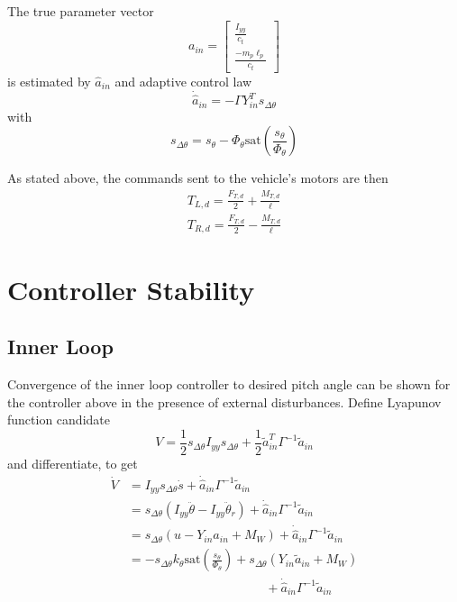 \documentclass[letterpaper, 10 pt, conference]{ieeeconf}\usepackage[margin=1in]{geometry}
\begin{document}
The true parameter vector
\begin{equation}
	a_{in} = \begin{bmatrix}
			\frac{I_{yy}}{c_t} \\
			\frac{-m_p \ell_p}{c_t}
		\end{bmatrix}
\end{equation}
is estimated by $\hat{a}_{in}$ and adaptive control law
\begin{equation}
	\dot{\hat{a}}_{in} = - \Gamma Y^T_{in} s_{\Delta \theta}
\end{equation}
with 
\begin{equation}
	s_{\Delta\theta} = s_{\theta} - \Phi_{\theta} \text{sat}(\frac{s_{\theta}}{\Phi_{\theta}})
\end{equation}

As stated above, the commands sent to the vehicle's motors are then
\begin{align}
	T_{L,d} = \frac{F_{T,d}}{2} + \frac{M_{T,d}}{\ell}\\
	T_{R,d} = \frac{F_{T,d}}{2} - \frac{M_{T,d}}{\ell}
\end{align}

\section{Controller Stability}
\subsection{Inner Loop}
Convergence of the inner loop controller to desired pitch angle can be shown for the controller above in the presence of external disturbances. Define Lyapunov function candidate
\begin{equation}
	V = \frac{1}{2}s_{\Delta \theta} I_{yy} s_{\Delta \theta} + \frac{1}{2}\tilde{a}_{in}^T \Gamma^{-1} \tilde{a}_{in}
\end{equation} 
and differentiate, to get
\begin{align*}
	\dot V &= I_{yy} s_{\Delta \theta} \dot s + \dot{\hat{a}}_{in} \Gamma^{-1} \tilde{a}_{in} \\
	~ &= s_{\Delta \theta} (I_{yy}\ddot{\theta} - I_{yy}\ddot{\theta}_r) + \dot{\hat{a}}_{in} \Gamma^{-1} \tilde{a}_{in} \\
	~ &= s_{\Delta \theta} (u - Y_{in}a_{in} + M_W) + \dot{\hat{a}}_{in} \Gamma^{-1} \tilde{a}_{in} \\
	~ &= - s_{\Delta \theta} k_\theta \text{sat}\left(\frac{s_\theta}{\Phi_\theta}\right) + s_{\Delta \theta}(Y_{in} \tilde{a}_{in} + M_W) \\ ~& \qquad ~\qquad ~ \qquad~ \qquad ~\qquad + \dot{\hat{a}}_{in} \Gamma^{-1} \tilde{a}_{in}
\end{align*}
\end{document}
